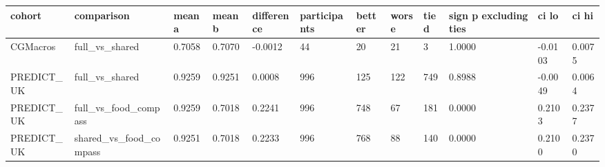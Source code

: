 {\footnotesize\setlength{\tabcolsep}{3pt}
\begin{longtable}{llllllllllll}
\toprule
\textbf{cohort} & \textbf{comparison} & \textbf{mean a} & \textbf{mean b} & \textbf{difference} & \textbf{participants} & \textbf{better} & \textbf{worse} & \textbf{tied} & \textbf{sign p excluding ties} & \textbf{ci lo} & \textbf{ci hi} \\
\midrule
\endhead
CGMacros & full\_vs\_shared & 0.7058 & 0.7070 & -0.0012 & 44 & 20 & 21 & 3 & 1.0000 & -0.0103 & 0.0075 \\
PREDICT\_UK & full\_vs\_shared & 0.9259 & 0.9251 & 0.0008 & 996 & 125 & 122 & 749 & 0.8988 & -0.0049 & 0.0064 \\
PREDICT\_UK & full\_vs\_food\_compass & 0.9259 & 0.7018 & 0.2241 & 996 & 748 & 67 & 181 & 0.0000 & 0.2103 & 0.2377 \\
PREDICT\_UK & shared\_vs\_food\_compass & 0.9251 & 0.7018 & 0.2233 & 996 & 768 & 88 & 140 & 0.0000 & 0.2100 & 0.2370 \\
\bottomrule
\end{longtable}}
